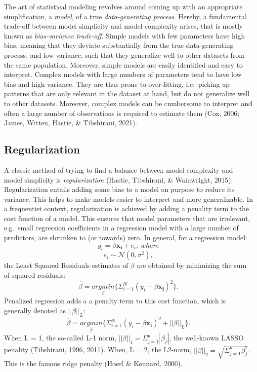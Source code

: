 \documentclass[
  man, donotrepeattitle,floatsintext]{apa6}
\begin{document}
The art of statistical modeling revolves around coming up with an appropriate simplification, a \emph{model}, of a true \emph{data-generating process}. Hereby, a fundamental trade-off between model simplicity and model complexity arises, that is mostly known as \emph{bias-variance trade-off}. Simple models with few parameters have high bias, meaning that they deviate substantially from the true data-generating process, and low variance, such that they generalize well to other datasets from the same population. Moreover, simple models are easily identified and easy to interpret. Complex models with large numbers of parameters tend to have low bias and high variance. They are thus prone to over-fitting, i.e.~picking up patterns that are only relevant in the dataset at hand, but do not generalize well to other datasets. Moreover, complex models can be cumbersome to interpret and often a large number of observations is required to estimate them (Cox, 2006; James, Witten, Hastie, \& Tibshirani, 2021).

\hypertarget{regularization}{%
\subsection{Regularization}\label{regularization}}

A classic method of trying to find a balance between model complexity and model simplicity is \emph{regularization} (Hastie, Tibshirani, \& Wainwright, 2015). Regularization entails adding some bias to a model on purpose to reduce its variance. This helps to make models easier to interpret and more generalizable. In a frequentist context, regularization is achieved by adding a penality term to the cost function of a model. This ensures that model parameters that are irrelevant, e.g.~small regression coefficients in a regression model with a large number of predictors, are shrunken to (or towards) zero. In general, for a regression model:
\[y_i = \beta \mathbf{x_i} + e_i, \ where \]
\[e_i \sim \mathcal{N}(0, \sigma^2), \]
the Least Squared Residuals estimates of \(\beta\) are obtained by minimizing the sum of squared residuals:
\[ \hat{\beta} = \underset{\beta}{argmin} \{ \Sigma_{i=1}^N(y_i - \beta\mathbf{x_{i}} )^2 \}.\] Penalized regression adds a a penalty term to this cost function, which is generally denoted as \(||\beta||_L\):
\[ \hat{\beta} = \underset{\beta}{argmin} \{ \Sigma_{i=1}^N(y_i - \beta \mathbf{x_{i}} )^2 + ||\beta||_{L} \}.\]
When L = 1, the so-called L-1 norm, \(||\beta||_1 = \Sigma_{j=1}^p |\beta_j|\), the well-known LASSO penality (Tibshirani, 1996, 2011). When, L = 2, the L2-norm, \(||\beta||_2 = \sqrt{\Sigma_{j=1}^p \beta_j^2}\). This is the famous ridge penalty (Hoerl \& Kennard, 2000).
\end{document}
